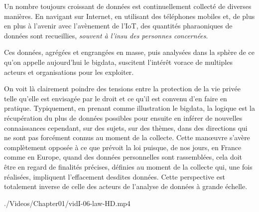 Un nombre toujours croissant de données est continuellement collecté de diverses manières. En navigant sur Internet, en utilisant des téléphones mobiles et, de plus en plus à l'avenir avec l'avènement de l'\gls{IoT}, des quantités pharaoniques de données sont recueillies, \emph{souvent à l'insu des personnes concernées}.

Ces données, agrégées et engrangées en masse, puis analysées dans la sphère de ce qu'on appelle aujourd'hui le \gls{bigdata}, suscitent l'intérêt vorace de multiples acteurs et organisations pour les exploiter.

On voit là clairement poindre des tensions entre la protection de la vie privée telle qu'elle est envisagée par le droit et ce qu'il est convenu d'en faire en pratique.
Typiquement, en prenant comme illustration le \gls{bigdata}, la logique est la récupération du plus de données possibles pour ensuite en inférer de nouvelles connaissances cependant, sur des sujets, sur des thèmes, dans des directions qui ne sont pas forcément connus au moment de la collecte. Cette manœuvre s'avère complètement opposée à ce que prévoit la loi puisque, de nos jours, en France comme en Europe, quand des données personnelles sont rassemblées, cela doit être en regard de finalités précises, définies au moment de la collecte qui, une fois réalisées, impliquent l'effacement desdites données.
Cette perspective est totalement inverse de celle des acteurs de l'analyse de données à grande échelle. 

\begin{marginvideo}
		{./Videos/Chapter01/vidI-06-law-HD.mp4}%
\end{marginvideo}

